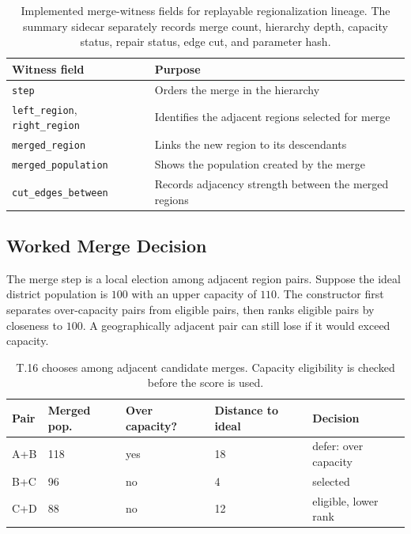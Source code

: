 \begin{table}[h]
\centering
\small
\begin{tabular}{ll}
\toprule
Witness field & Purpose \\
\midrule
\texttt{step} & Orders the merge in the hierarchy \\
\texttt{left\_region}, \texttt{right\_region} & Identifies the adjacent regions selected for merge \\
\texttt{merged\_region} & Links the new region to its descendants \\
\texttt{merged\_population} & Shows the population created by the merge \\
\texttt{cut\_edges\_between} & Records adjacency strength between the merged regions \\
\bottomrule
\end{tabular}
\caption{Implemented merge-witness fields for replayable regionalization
lineage. The summary sidecar separately records merge count, hierarchy depth,
capacity status, repair status, edge cut, and parameter hash.}
\end{table}

\subsection{Worked Merge Decision}

The merge step is a local election among adjacent region pairs. Suppose the
ideal district population is \(100\) with an upper capacity of \(110\). The
constructor first separates over-capacity pairs from eligible pairs, then ranks
eligible pairs by closeness to \(100\). A geographically adjacent pair can still
lose if it would exceed capacity.

\begin{table}[h]
\centering
\small
\begin{tabular}{lllll}
\toprule
Pair & Merged pop. & Over capacity? & Distance to ideal & Decision \\
\midrule
A+B & 118 & yes & 18 & defer: over capacity \\
B+C & 96 & no & 4 & selected \\
C+D & 88 & no & 12 & eligible, lower rank \\
\bottomrule
\end{tabular}
\caption{T.16 chooses among adjacent candidate merges. Capacity eligibility is
checked before the score is used.}
\end{table}
